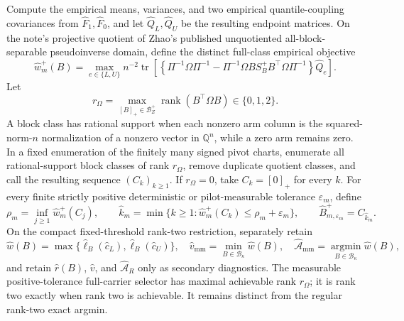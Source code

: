 Compute the empirical means, variances, and two empirical quantile-coupling covariances from \(\widehat F_1,\widehat F_0\), and let \(\widehat Q_L,\widehat Q_U\) be the resulting endpoint matrices.  On the note's projective quotient of Zhao's published unquotiented all-block-separable pseudoinverse domain, define the distinct full-class empirical objective
\[
\widehat w_m^+(B)=
\max_{e\in\{L,U\}}n^{-2}\operatorname{tr}\!\left[
\left\{\Pi^{-1}\Omega\Pi^{-1}
-\Pi^{-1}\Omega B S_B^+B^{\top}\Omega\Pi^{-1}\right\}\widehat Q_e
\right].
\]
Let
\[
r_\Omega=\max_{[B]_+\in\mathcal B_Z^+}\operatorname{rank}(B^{\top}\Omega B)\in\{0,1,2\}.
\]
A block class has rational support when each nonzero arm column is the squared-norm-\(n\) normalization of a nonzero vector in \(\mathbb Q^n\), while a zero arm remains zero.  In a fixed enumeration of the finitely many signed pivot charts, enumerate all rational-support block classes of rank \(r_\Omega\), remove duplicate quotient classes, and call the resulting sequence \((C_k)_{k\ge1}\).  If \(r_\Omega=0\), take \(C_k=[0]_+\) for every \(k\).  For every finite strictly positive deterministic or pilot-measurable tolerance \(\varepsilon_m\), define
\[
 \rho_m=\inf_{j\ge1}\widehat w_m^+(C_j),
 \qquad
 \widehat k_m=
 \min\{k\ge1:\widehat w_m^+(C_k)\le\rho_m+\varepsilon_m\},
 \qquad
 \widehat B_{m,\varepsilon_m}^+=C_{\widehat k_m}.
\]
On the compact fixed-threshold rank-two restriction, separately retain
\[
\widehat w(B)=\max\{\widehat\ell_B(\widehat c_L),\widehat\ell_B(\widehat c_U)\},
\quad
\widehat v_{\mathrm{mm}}=\min_{B\in\mathcal B_\kappa}\widehat w(B),
\quad
\widehat{\mathcal A}_{\mathrm{mm}}=\operatorname*{argmin}_{B\in\mathcal B_\kappa}\widehat w(B),
\]
and retain \(\widehat r(B)\), \(\widehat v\), and \(\widehat{\mathcal A}_R\) only as secondary diagnostics.  The measurable positive-tolerance full-carrier selector has maximal achievable rank \(r_\Omega\); it is rank two exactly when rank two is achievable.  It remains distinct from the regular rank-two exact argmin.